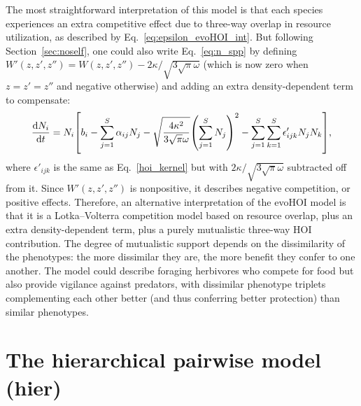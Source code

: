 \documentclass[10pt]{article}
\newcommand{\ud}{\text{d}}
\let\originalleft\left
\let\originalright\right
\renewcommand{\left}{\mathopen{}\mathclose\bgroup\originalleft}
\renewcommand{\right}{\aftergroup\egroup\originalright}
\begin{document}
The most straightforward interpretation of this model is that each species experiences an extra competitive effect due to three-way overlap in resource utilization, as described by Eq.~\ref{eq:epsilon_evoHOI_int}. But following Section~\ref{sec:noself}, one could also write Eq.~\ref{eq:n_spp} by defining $W'(z,z',z'') = W(z,z',z'') - 2\kappa/\sqrt{3\sqrt{\pi} \omega}$ (which is now zero when $z=z'=z''$ and negative otherwise) and adding an extra density-dependent term to compensate:
\begin{equation}
  \label{eq:ehoHOI_alt}
  \frac{\ud N_i}{\ud t}
  = N_i \left[ b_i
  - \sum_{j=1}^S \alpha_{ij} N_j
  - \sqrt{\frac{4\kappa^2}{3 \sqrt{\pi} \omega}}
    \left( \sum_{j=1}^S N_j \right)^2
  - \sum_{j=1}^S \sum_{k=1}^S \epsilon'_{ijk} N_j N_k \right] ,
\end{equation}
where $\epsilon'_{ijk}$ is the same as Eq.~\ref{hoi_kernel} but with $2\kappa/\sqrt{3\sqrt{\pi} \omega}$ subtracted off from it. Since $W'(z,z',z'')$ is nonpositive, it describes negative competition, or positive effects. Therefore, an alternative interpretation of the evoHOI model is that it is a Lotka--Volterra competition model based on resource overlap, plus an extra density-dependent term, plus a purely mutualistic three-way HOI contribution. The degree of mutualistic support depends on the dissimilarity of the phenotypes: the more dissimilar they are, the more benefit they confer to one another. The model could describe foraging herbivores who compete for food but also provide vigilance against predators, with dissimilar phenotype triplets complementing each other better (and thus conferring better protection) than similar phenotypes.


\section{The hierarchical pairwise model (hier)}
\end{document}
